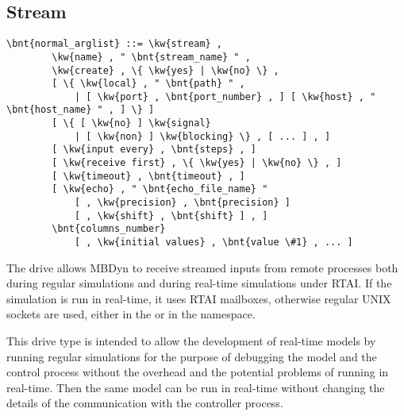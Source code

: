 \subsection{Stream}\label{sec:Stream}
\begin{Verbatim}[commandchars=\\\{\}]
    \bnt{normal_arglist} ::= \kw{stream} ,
        \kw{name} , " \bnt{stream_name} " ,
        \kw{create} , \{ \kw{yes} | \kw{no} \} ,
        [ \{ \kw{local} , " \bnt{path} " ,
            | [ \kw{port} , \bnt{port_number} , ] [ \kw{host} , " \bnt{host_name} " , ] \} ]
        [ \{ [ \kw{no} ] \kw{signal}
            | [ \kw{non} ] \kw{blocking} \} , [ ... ] , ]
        [ \kw{input every} , \bnt{steps} , ]
        [ \kw{receive first} , \{ \kw{yes} | \kw{no} \} , ]
        [ \kw{timeout} , \bnt{timeout} , ]
        [ \kw{echo} , " \bnt{echo_file_name} "
            [ , \kw{precision} , \bnt{precision} ]
            [ , \kw{shift} , \bnt{shift} ] , ]
        \bnt{columns_number}
            [ , \kw{initial values} , \bnt{value \#1} , ... ]
\end{Verbatim}
The  drive allows MBDyn to receive streamed inputs 
from remote processes both during regular simulations and during 
real-time simulations under RTAI.
If the simulation is run in real-time, it uses RTAI mailboxes, 
otherwise regular UNIX sockets are used, either in the  or 
in the  namespace.

This drive type is intended to allow the development of real-time models
by running regular simulations for the purpose of debugging the model
and the control process without the overhead and the potential problems
of running in real-time.
Then the same model can be run in real-time without changing the details
of the communication with the controller process.

